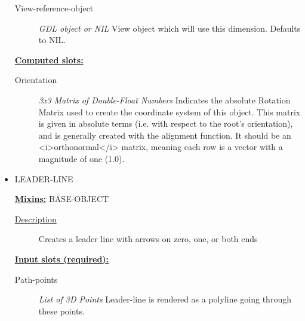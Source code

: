 \documentclass [11pt]{book}
\begin{document}
\begin{itemize}
\begin{description}
\item [View-reference-object]
\emph{GDL object or NIL} View object which will use this dimension. Defaults to NIL.


\end{description}






\textbf{
\underline{Computed slots:}}

\begin{description}

\item [Orientation]
\emph{3x3 Matrix of Double-Float Numbers} Indicates the absolute Rotation Matrix used to create
the coordinate system of this object. This matrix is given in absolute terms (i.e. with
respect to the root's orientation), and is generally created with the alignment function.
It should be an <i>orthonormal</i> matrix, meaning each row is a vector with a magnitude
of one (1.0).


\end{description}







\item {}LEADER-LINE


\textbf{
\underline{Mixins:}} BASE-OBJECT





\begin{description}

\item [
\underline{Description}]


Creates a leader line with arrows on zero, one, or both ends



\end{description}








\textbf{
\underline{Input slots (required):}}

\begin{description}

\item [Path-points]
\emph{List of 3D Points} Leader-line is rendered as a polyline going through these points.



\end{description}
\end{itemize}
\end{document}
